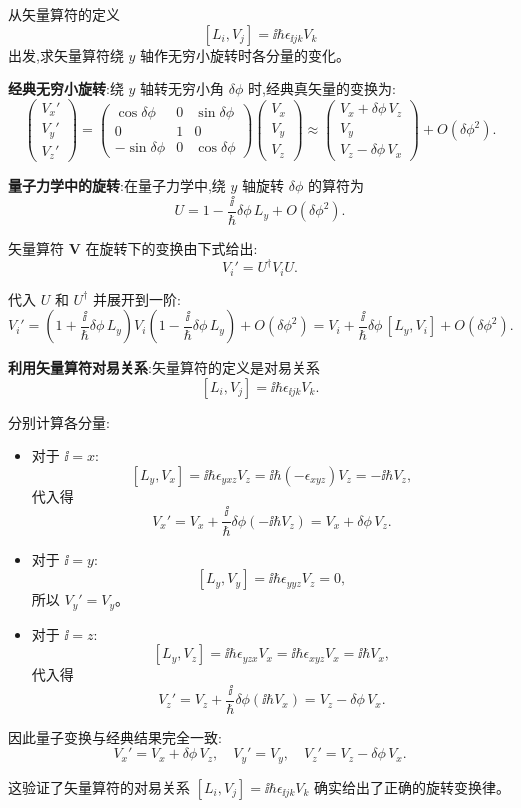 \begin{question}
从矢量算符的定义
\[
[L_i,V_j]=\ii\hbar\epsilon_{\ii jk}V_k
\]
出发,求矢量算符绕 $y$ 轴作无穷小旋转时各分量的变化。
\begin{solution}
	\textbf{经典无穷小旋转}:绕 $y$ 轴转无穷小角 $\delta\phi$ 时,经典真矢量的变换为:
	\[
	\begin{pmatrix}V_x'\\V_y'\\V_z'\end{pmatrix}
	= \begin{pmatrix}\cos\delta\phi&0&\sin\delta\phi\\0&1&0\\-\sin\delta\phi&0&\cos\delta\phi\end{pmatrix}
	\begin{pmatrix}V_x\\V_y\\V_z\end{pmatrix}
	\approx \begin{pmatrix}V_x + \delta\phi\,V_z\\V_y\\V_z - \delta\phi\,V_x\end{pmatrix}+O(\delta\phi^2).
	\]

	\textbf{量子力学中的旋转}:在量子力学中,绕 $y$ 轴旋转 $\delta\phi$ 的算符为
	\[
	U = 1 - \frac{\ii}{\hbar}\delta\phi\,L_y + O(\delta\phi^2).
	\]

	矢量算符 $\mathbf V$ 在旋转下的变换由下式给出:
	\[
	V_i' = U^\dagger V_i U.
	\]

	代入 $U$ 和 $U^\dagger$ 并展开到一阶:
	\[
	V_i' = \left(1+\frac{\ii}{\hbar}\delta\phi\,L_y\right) V_i \left(1-\frac{\ii}{\hbar}\delta\phi\,L_y\right) + O(\delta\phi^2)
	= V_i + \frac{\ii}{\hbar}\delta\phi\,[L_y,V_i] + O(\delta\phi^2).
	\]

	\textbf{利用矢量算符对易关系}:矢量算符的定义是对易关系
	\[
	[L_i,V_j] = \ii\hbar\epsilon_{\ii jk}V_k.
	\]

	分别计算各分量:
	\begin{itemize}
	\item 对于 $\ii=x$:
	\[
	[L_y,V_x] = \ii\hbar\epsilon_{yxz}V_z = \ii\hbar(-\epsilon_{xyz})V_z = -\ii\hbar V_z,
	\]
	代入得
	\[
	V_x' = V_x + \frac{\ii}{\hbar}\delta\phi(-\ii\hbar V_z) = V_x + \delta\phi\,V_z.
	\]

	\item 对于 $\ii=y$:
	\[
	[L_y,V_y] = \ii\hbar\epsilon_{yyz}V_z = 0,
	\]
	所以 $V_y' = V_y$。

	\item 对于 $\ii=z$:
	\[
	[L_y,V_z] = \ii\hbar\epsilon_{yzx}V_x = \ii\hbar\epsilon_{xyz}V_x = \ii\hbar V_x,
	\]
	代入得
	\[
	V_z' = V_z + \frac{\ii}{\hbar}\delta\phi(\ii\hbar V_x) = V_z - \delta\phi\,V_x.
	\]
	\end{itemize}

	因此量子变换与经典结果完全一致:
	\[
	\boxed{V_x' = V_x + \delta\phi\,V_z,\quad V_y' = V_y,\quad V_z' = V_z - \delta\phi\,V_x}.
	\]

	这验证了矢量算符的对易关系 $[L_i,V_j]=\ii\hbar\epsilon_{\ii jk}V_k$ 确实给出了正确的旋转变换律。
	\end{solution}
\end{question}


